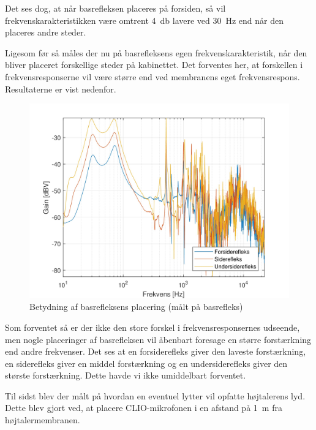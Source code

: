 Det ses dog, at når basrefleksen placeres på forsiden, så vil frekvenskarakteristikken være omtrent \SI{4}{\decibel} lavere ved \SI{30}{\hertz} end når den placeres andre steder.

\newpage
Ligesom før så måles der nu på basrefleksens egen frekvenskarakteristik, når den bliver placeret forskellige steder på kabinettet. Det forventes her, at forskellen i frekvensresponserne vil være større end ved membranens eget frekvensrespons. Resultaterne er vist nedenfor.
\begin{figure}[H]
	\centering
	\vspace{-12pt}
	\includegraphics[width=\textwidth]{Billeder/Grafer/BasrefleksPlacementTube}
	\caption{Betydning af basrefleksens placering (målt på basrefleks)}
\end{figure}

Som forventet så er der ikke den store forskel i frekvensresponsernes udseende, men nogle placeringer af basrefleksen vil åbenbart foresage en større forstærkning end andre frekvenser. Det ses at en forsiderefleks giver den laveste forstærkning, en siderefleks giver en middel forstærkning og en undersiderefleks giver den største forstærkning. Dette havde vi ikke umiddelbart forventet.

\newpage
Til sidst blev der målt på hvordan en eventuel lytter vil opfatte højtalerens lyd. Dette blev gjort ved, at placere CLIO-mikrofonen i en afstand på \SI{1}{\meter} fra højtalermembranen.

